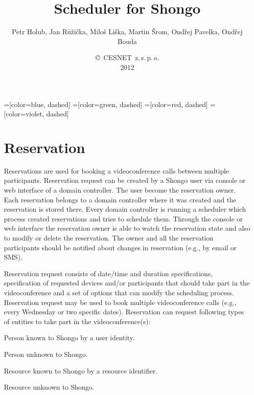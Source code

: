 \documentclass[a4paper]{report}
\begin{document}
\title{Scheduler for Shongo}
\author{Petr Holub, Jan Růžička, Miloš Liška, Martin Šrom, Ondřej Pavelka, 
        Ondřej Bouda}
\date{\copyright~CESNET~z.\,s.\,p.\,o.\\2012}
\maketitle
\tableofcontents

=[color=blue, dashed]
=[color=green, dashed]
=[color=red, dashed]
=[color=violet, dashed]





\chapter{Reservation}

Reservations are used for booking a videoconference calls between multiple participants. Reservation request can be created by a Shongo user via console or web interface of a domain controller. The user become the reservation owner. Each reservation belongs to a domain controller where it was created and the reservation is stored there. Every domain controller is running a scheduler which process created reservations and tries to schedule them. Through the console or web interface the reservation owner is able to watch the reservation state and also to modify or delete the reservation. The owner and all the reservation participants should be notified about changes in reservation (e.g., by email or SMS). 

Reservation request consists of date/time and duration specifications, specification of requested devices and/or participants that should take part in the videoconference and a set of options that can modify the scheduling process. Reservation request may be used to book multiple videoconference calls (e.g., every Wednesday or two specific dates). Reservation can request following types of entities to take part in the videoconference(s):
\begin{compactenum}
\item Person known to Shongo by a user identity.
\item Person unknown to Shongo. 
\item Resource known to Shongo by a resource identifier.
\item Resource unknown to Shongo.
\end{compactenum}
\end{document}
